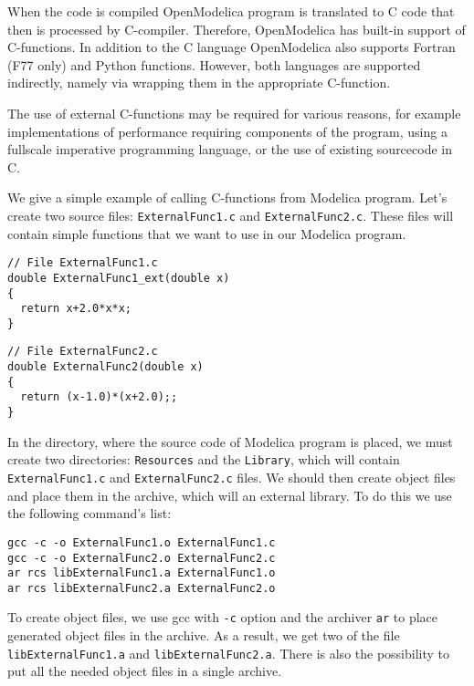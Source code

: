 \documentclass[%
floatfix,
showkeys,
nofootinbib, %
superscriptaddress, %
]{revtex4-1}
\begin{document}
When the code is compiled OpenModelica program is translated to C code
that then is processed by C-compiler. Therefore, OpenModelica has
built-in support of C-functions. In addition to the C language
OpenModelica also supports Fortran (F77 only) and Python
functions. However, both languages are supported indirectly, namely
via wrapping them in the appropriate C-function.

The use of external C-functions may be required for various reasons,
for example implementations of performance requiring components of the
program, using a fullscale imperative programming language, or the use
of existing sourcecode in C.

We give a simple example of calling C-functions from Modelica
program. Let's create two source files: \verb|ExternalFunc1.c| and
\verb|ExternalFunc2.c|. These files will contain simple functions that
we want to use in our Modelica program.

\begin{verbatim}
// File ExternalFunc1.c
double ExternalFunc1_ext(double x)
{
  return x+2.0*x*x;
}
\end{verbatim}
\begin{verbatim}
// File ExternalFunc2.c
double ExternalFunc2(double x)
{
  return (x-1.0)*(x+2.0);;
}
\end{verbatim}
In the directory, where the source code of Modelica program is placed,
we must create two directories: \verb|Resources| and the
\verb|Library|, which will contain \verb|ExternalFunc1.c| and
\verb|ExternalFunc2.c| files. We should then create object files and
place them in the archive, which will an external library. To do this
we use the following command's list:
\begin{verbatim}
gcc -c -o ExternalFunc1.o ExternalFunc1.c
gcc -c -o ExternalFunc2.o ExternalFunc2.c
ar rcs libExternalFunc1.a ExternalFunc1.o
ar rcs libExternalFunc2.a ExternalFunc2.o
\end{verbatim}

To create object files, we use gcc with \verb|-c| option and the
archiver \verb|ar| to place generated object files in the archive. As
a result, we get two of the file \verb|libExternalFunc1.a| and
\verb|libExternalFunc2.a|. There is also the possibility to put all
the needed object files in a single archive.
\end{document}
